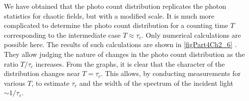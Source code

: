 We have obtained that the photo count distribution replicates the
photon statistics for chaotic fields, but with a modified scale. It is much
more complicated to determine the photo count distribution for a counting time $T$
corresponding to the intermediate case $T \approx \tau_c$. Only numerical calculations
are possible here. The results of such calculations are shown
in \autoref{figPart4Ch2_6} \cite{bLoudon1976}. They allow judging the nature
of changes in the photo count distribution as the ratio
$T/\tau_c$ increases. From the graphs, it is clear that the character of the distribution changes
near $T = \tau_c$.  This allows, by conducting measurements for various
$T$, to estimate $\tau_c$ and the width of the spectrum of the incident
light $\sim 1/\tau_c$. 

